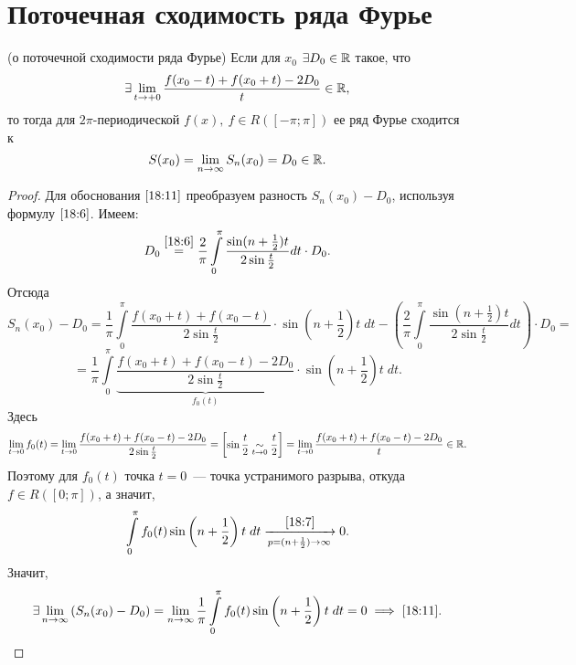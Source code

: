 \documentclass[../../main.tex]{subfiles}
\begin{document}
\section{Поточечная сходимость ряда Фурье}
\begin{thm}(о поточечной сходимости ряда Фурье)
	Если для $x_0$ $\exists D_0 \in \mathbb{R}$ такое, что
	\[\exists \lim\limits_{t \rightarrow +0}{\dfrac
		{f(x_0 - t) + f(x_0 + t) - 2D_0}{t}} \in \mathbb{R},\] то тогда для
	$2\pi$-периодической $f(x),\ f \in R([-\pi; \pi])$ ее ряд Фурье
	сходится к
	\begin{equation}
		\label{18:11}
		S(x_0) = \lim\limits_{n \rightarrow \infty}S_n(x_0) = D_0 \in \mathbb{R}.
	\end{equation}
\end{thm}
\begin{proof}
	Для обоснования $\eqref{18:11}$ преобразуем разность 
	$S_n(x_0) - D_0$, используя формулу $\eqref{18:6}$. Имеем:
	\[D_0 \stackrel{\eqref{18:6}}{=} \dfrac{2}{\pi}
	\int\limits_{0}^{\pi}{\dfrac{\sin(n+\frac{1}{2})t}{2\sin\frac{t}{2}}
	dt} \cdot D_0.\]
	Отсюда
	\[S_n(x_0) - D_0 = \dfrac{1}{\pi}\int\limits_{0}^{\pi}
	{\dfrac{f(x_0 + t) + f(x_0 - t)}{2\sin\frac{t}{2}}} \cdot 
	\sin\left(n + \frac{1}{2}\right)t\;dt - 
	\left(\dfrac{2}{\pi}\int\limits_{0}^{\pi}
	\dfrac{\sin(n + \frac{1}{2})t}{2\sin\frac{t}{2}}dt\right)\cdot D_0 =\]
	\[= \dfrac{1}{\pi}\int\limits_{0}^{\pi}{\underbrace{\frac{f(x_0 + t) +
		f(x_0 - t) - 2D_0}{2\sin\frac{t}{2}}}_{f_0(t)}}\cdot\sin\left(n + 
		\dfrac{1}{2}\right)t\;dt.\]
	Здесь
	\[\lim\limits_{t \rightarrow 0}{f_0(t)} = 
	\lim\limits_{t \rightarrow 0}{\dfrac{f(x_0 + t) + f(x_0 - t) - 2D_0}
		{2\sin\frac{t}{2}}} =
	\left[ 
	\begin{gathered} 
	\sin\dfrac{t}{2} \underset {t \rightarrow 0}{\sim} \dfrac{t}{2} 
	\end{gathered} 
	\right]  =
	\lim\limits_{t \rightarrow 0}{\dfrac{f(x_0 + t) + f(x_0 - t)-
		2D_0}t} \in \mathbb{R}.\]
	Поэтому для $f_0(t)$ точка $t = 0$~--- точка устранимого разрыва, откуда
	$f \in R([0; \pi])$, а значит,
	\[\int\limits_{0}^{\pi}{f_0(t)\sin\left(n+\dfrac{1}{2}\right)t\;dt} 
	\stk{18:7}{\appr
		{p=(n+\frac{1}{2}) \rightarrow \infty}} 0.\]
	Значит, \[\exists \lim\limits_{n \rightarrow \infty}{(
		S_n(x_0) - D_0)} = \lim\limits_{n\rightarrow \infty}
	{\dfrac{1}{\pi}} \int\limits_{0}^{\pi} 
	{f_0(t)\sin\left(n+\dfrac{1}{2}\right)t\;dt} = 0
	\implies \eqref{18:11}. \qedhere\]
\end{proof}
\end{document}
